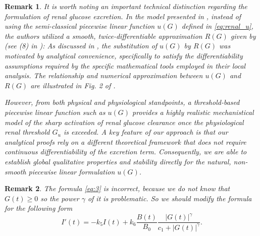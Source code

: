 \documentclass[pdflatex,sn-mathphys-num]{sn-jnl}
\theoremstyle{thmstyleone}
\theoremstyle{thmstyletwo}
\theoremstyle{thmstylethree}
\newtheorem{remark}{Remark}[section]
\begin{document}
\begin{remark}
It is worth noting an important technical distinction regarding the formulation of renal glucose 
excretion. In the model presented in \cite{degaetano2024}, instead of using the semi-classical 
piecewise linear function $u(G)$ defined in \eqref{eq:renal_u}, the authors utilized a smooth, 
twice-differentiable approximation $R(G)$ given by (see (8) in \cite{degaetano2024}):
As discussed in \cite{degaetano2024}, the substitution of $u(G)$ by $R(G)$ was motivated by 
analytical convenience, specifically to satisfy the differentiability assumptions required by the 
specific mathematical tools employed in their local analysis. The relationship and numerical 
approximation between $u(G)$ and $R(G)$ are illustrated in Fig. 2 of \cite{degaetano2024}. 

However, from both physical and physiological standpoints, a threshold-based piecewise linear 
function such as $u(G)$ provides a highly realistic mechanistical model of the sharp activation 
of renal glucose clearance once the physiological renal threshold $G_u$ is exceeded. A key 
feature of our approach is that our analytical proofs rely on a different theoretical framework 
that does not require continuous differentiability of the excretion term. Consequently, we are 
able to establish global qualitative properties and stability directly for the natural, non-
smooth piecewise linear formulation $u(G)$.
\end{remark}
\begin{remark}
    The formula \eqref{eq:3} is incorrect, because we do not know that $G(t)\geq 0$ so the 
    power $\gamma$ of it is problematic. So we should modify the formula for the following form 
\begin{equation*}
    I'(t) =-k_5I(t)+k_6 \frac{B(t)}{B_0} \frac{|G(t)|^{\gamma}}{c_1+|G(t)|^{\gamma}}.
\end{equation*}
\end{remark}
\end{document}

